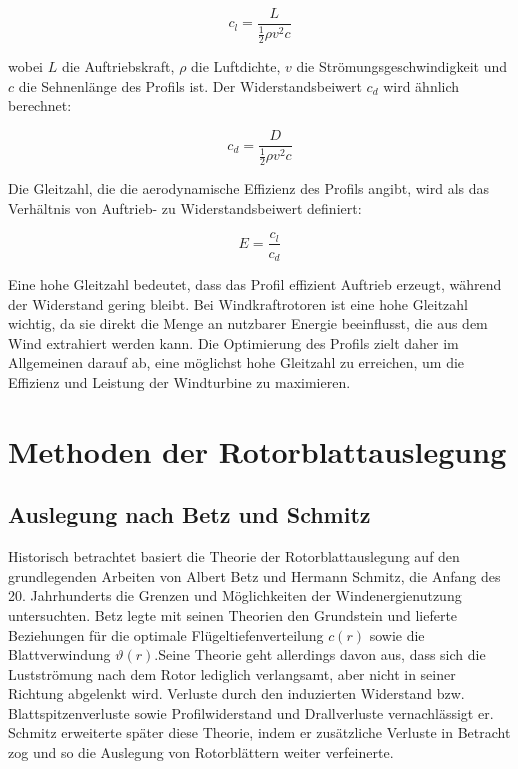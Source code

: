 \begin{equation}
c_l = \frac{L}{\frac{1}{2} \rho v^2 c}
\end{equation}

wobei \( L \) die Auftriebskraft, \( \rho \) die Luftdichte, \( v \) die Strömungsgeschwindigkeit und \( c \) die Sehnenlänge des Profils ist. Der Widerstandsbeiwert \( c_d \) wird ähnlich berechnet:

\begin{equation}
c_d = \frac{D}{\frac{1}{2} \rho v^2 c}
\end{equation}

Die Gleitzahl, die die aerodynamische Effizienz des Profils angibt, wird als das Verhältnis von Auftrieb- zu Widerstandsbeiwert definiert:

\begin{equation}
E = \frac{c_l}{c_d}
\end{equation}

Eine hohe Gleitzahl bedeutet, dass das Profil effizient Auftrieb erzeugt, während der Widerstand gering bleibt. 
Bei Windkraftrotoren ist eine hohe Gleitzahl wichtig, da sie direkt die Menge an nutzbarer Energie beeinflusst, die aus dem Wind extrahiert werden kann. Die Optimierung des Profils zielt daher im Allgemeinen darauf ab, eine möglichst hohe Gleitzahl zu erreichen, um die Effizienz und Leistung der Windturbine zu maximieren.


\section{Methoden der Rotorblattauslegung}
\subsection{Auslegung nach Betz und Schmitz}
\label{subsec:betz-schmitz-auslegung}
Historisch betrachtet basiert die Theorie der Rotorblattauslegung auf den grundlegenden Arbeiten von Albert Betz und Hermann Schmitz, die Anfang des 20. Jahrhunderts die Grenzen und Möglichkeiten der Windenergienutzung untersuchten. Betz legte mit seinen Theorien den Grundstein und lieferte Beziehungen für die optimale Flügeltiefenverteilung \( c(r) \) sowie die Blattverwindung \( \vartheta(r) \).Seine Theorie geht allerdings davon aus, dass sich die Lustströmung nach dem Rotor lediglich verlangsamt, aber nicht in seiner Richtung abgelenkt wird. Verluste durch den induzierten Widerstand bzw. Blattspitzenverluste sowie Profilwiderstand und Drallverluste vernachlässigt er. Schmitz erweiterte später diese Theorie, indem er zusätzliche Verluste in Betracht zog und so die Auslegung von Rotorblättern weiter verfeinerte. 

